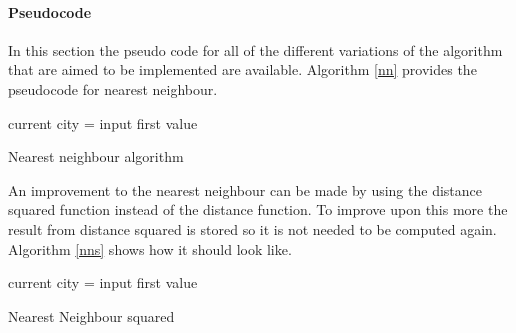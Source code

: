 \documentclass[conference,backref=page]{acmsiggraph}
\begin{document}
\paragraph{Pseudocode} \hfill

In this section the pseudo code for all of the different variations of the algorithm that are aimed to be implemented are available. Algorithm \ref{nn} provides the pseudocode for nearest neighbour.

\begin{algorithm}[h]	
	current city = input first value\\
\caption{Nearest neighbour algorithm}
\label{nn}

\end{algorithm}

An improvement to the nearest neighbour can be made by using the distance squared function instead of the distance function. To improve upon this more the result from distance squared is stored so it is not needed to be computed again. Algorithm \ref{nns} shows how it should look like.

\begin{algorithm}[h]	
	current city = input first value\\
\caption{Nearest Neighbour squared}
\label{nns}
\end{algorithm}\hfill
\end{document}
